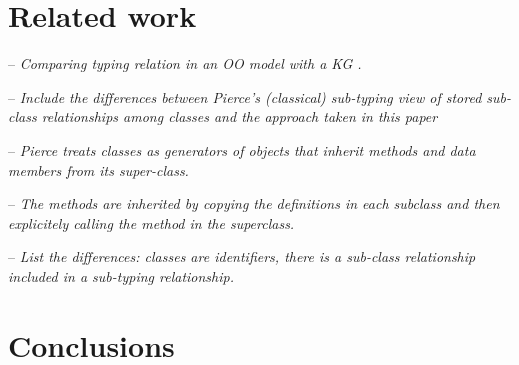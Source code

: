 \documentclass[runningheads]{llncs}
\newcommand{\notes}[1]{\noindent\begin{small}-- \emph{#1}\\\end{small}}
\begin{document}
\section{Related work}

\notes{Comparing typing relation in an OO model with a KG \cite{Pierce2002}.}
\notes{Include the differences between Pierce's (classical) sub-typing view of stored sub-class relationships among classes and the approach taken in this paper}
\notes{Pierce treats classes as generators of objects that inherit methods and data members from its super-class.}
\notes{The methods are inherited by copying the definitions in each subclass and then explicitely calling the method in the superclass.}
\notes{List the differences: classes are identifiers, there is a sub-class relationship included in a sub-typing relationship.}






\section{Conclusions}



%



\end{document}
